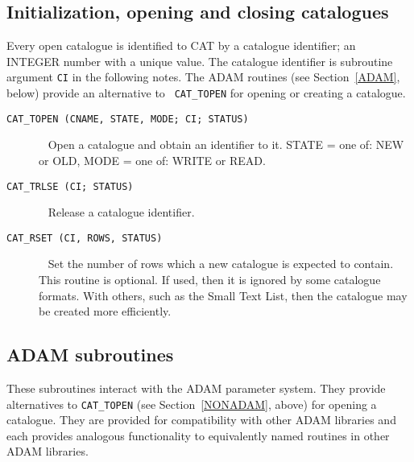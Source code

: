


\subsection{\label{NONADAM}Initialization, opening and closing catalogues}

Every open catalogue is identified to CAT by a catalogue identifier;
an INTEGER number with a unique value. The catalogue identifier is
subroutine argument {\tt CI} in the following notes. The ADAM routines 
(see Section~\ref{ADAM}, below) provide an alternative to {\tt
CAT\_TOPEN} for opening or creating a catalogue.

\begin{description}

  \item[ {\tt CAT\_TOPEN (CNAME, STATE, MODE; CI; STATUS) } ] ~
  \newline Open a catalogue and obtain an identifier to it.
  \newline STATE = one of: NEW or OLD,
  \newline MODE = one of: WRITE or READ.

  \item[ {\tt CAT\_TRLSE (CI; STATUS) } ] ~
  \newline Release a catalogue identifier.

  \item[ {\tt CAT\_RSET (CI, ROWS, STATUS) } ] ~
  \newline Set the number of rows which a new catalogue is expected to
   contain.  This routine is optional.  If used, then it is ignored by
   some catalogue formats.  With others, such as the Small Text List,
   then the catalogue may be created more efficiently.

\end{description}


\subsection{\label{ADAM}ADAM subroutines}

These subroutines interact with the ADAM parameter system. They provide
alternatives to {\tt CAT\_TOPEN} (see Section~\ref{NONADAM}, above) for
opening a catalogue. They are provided for compatibility with other
ADAM libraries and each provides analogous functionality to equivalently
named routines in other ADAM libraries.

